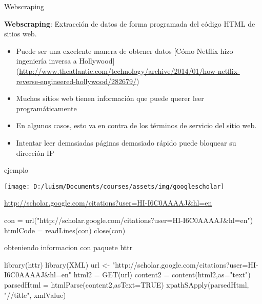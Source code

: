 \documentclass[
]{article}
\newenvironment{Shaded}{\begin{snugshade}}{\end{snugshade}}
\newcommand{\AttributeTok}[1]{\textcolor[rgb]{0.77,0.63,0.00}{#1}}
\newcommand{\ConstantTok}[1]{\textcolor[rgb]{0.00,0.00,0.00}{#1}}
\newcommand{\FunctionTok}[1]{\textcolor[rgb]{0.00,0.00,0.00}{#1}}
\newcommand{\NormalTok}[1]{#1}
\newcommand{\OtherTok}[1]{\textcolor[rgb]{0.56,0.35,0.01}{#1}}
\newcommand{\StringTok}[1]{\textcolor[rgb]{0.31,0.60,0.02}{#1}}
\providecommand{\tightlist}{%
  \setlength{\itemsep}{0pt}\setlength{\parskip}{0pt}}
\begin{document}
Webscraping

\textbf{Webscraping}: Extracción de datos de forma programada del código
HTML de sitios web.

\begin{itemize}
\tightlist
\item
  Puede ser una excelente manera de obtener datos {[}Cómo Netflix hizo
  ingeniería inversa a Hollywood{]}
  (\url{http://www.theatlantic.com/technology/archive/2014/01/how-netflix-reverse-engineered-hollywood/282679/})
\item
  Muchos sitios web tienen información que puede querer leer
  programáticamente
\item
  En algunos casos, esto va en contra de los términos de servicio del
  sitio web.
\item
  Intentar leer demasiadas páginas demasiado rápido puede bloquear su
  dirección IP
\end{itemize}

ejemplo

\begin{center}\texttt{[image: D:/luism/Documents/courses/assets/img/googlescholar]} \end{center}

\url{http://scholar.google.com/citations?user=HI-I6C0AAAAJ\&hl=en}

\begin{Shaded}
\begin{Highlighting}[]
\NormalTok{con }\OtherTok{=} \FunctionTok{url}\NormalTok{(}\StringTok{"http://scholar.google.com/citations?user=HI{-}I6C0AAAAJ\&hl=en"}\NormalTok{)}
\NormalTok{htmlCode }\OtherTok{=} \FunctionTok{readLines}\NormalTok{(con)}
\FunctionTok{close}\NormalTok{(con)}
\end{Highlighting}
\end{Shaded}

obteniendo informacion con paquete httr

\begin{Shaded}
\begin{Highlighting}[]
\FunctionTok{library}\NormalTok{(httr)}
\FunctionTok{library}\NormalTok{(XML)}
\NormalTok{url }\OtherTok{\textless{}{-}} \StringTok{"http://scholar.google.com/citations?user=HI{-}I6C0AAAAJ\&hl=en"}
\NormalTok{html2 }\OtherTok{=} \FunctionTok{GET}\NormalTok{(url)}
\NormalTok{content2 }\OtherTok{=} \FunctionTok{content}\NormalTok{(html2,}\AttributeTok{as=}\StringTok{"text"}\NormalTok{)}
\NormalTok{parsedHtml }\OtherTok{=} \FunctionTok{htmlParse}\NormalTok{(content2,}\AttributeTok{asText=}\ConstantTok{TRUE}\NormalTok{)}
\FunctionTok{xpathSApply}\NormalTok{(parsedHtml, }\StringTok{"//title"}\NormalTok{, xmlValue)}
\end{Highlighting}
\end{Shaded}
\end{document}
